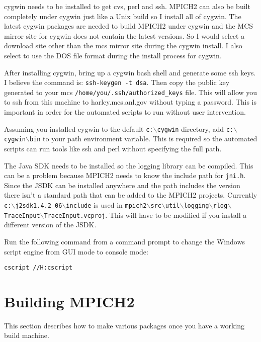 \documentclass[dvipdfm,11pt]{article}
\begin{document}
cygwin needs to be installed to get cvs, perl and ssh.  MPICH2 can also be built completely
under cygwin just like a Unix build so I install all of cygwin.  The latest cygwin packages
are needed to build MPICH2 under cygwin and the MCS mirror site for cygwin does not contain
the latest versions.  So I would select a download site other than the mcs mirror site during
the cygwin install.  I also select to use the DOS file format during the install process for 
cygwin.

After installing cygwin, bring up a cygwin bash shell and generate some ssh keys.  I believe
the command is: \texttt{ssh-keygen -t dsa}.  Then copy the public key generated to your
mcs \texttt{/home/you/.ssh/authorized\_keys} file.  This will allow you to ssh from this machine
to harley.mcs.anl.gov without typing a password.  This is important in order for the 
automated scripts to run without user intervention.

Assuming you installed cygwin to the default \texttt{c:$\backslash$cygwin} directory, add 
\texttt{c:$\backslash$cygwin$\backslash$bin} to your path environment variable.  This is 
required so the automated scripts can run tools like ssh and perl without specifying the 
full path.

The Java SDK needs to be installed so the logging library can be compiled.  This can be a problem
because MPICH2 needs to know the include path for \texttt{jni.h}.  Since the JSDK can be installed anywhere
and the path includes the version there isn't a standard path that can be added to the MPICH2 
projects.  Currently \texttt{c:$\backslash$j2sdk1.4.2\_06$\backslash$include} is used in
\texttt{mpich2$\backslash$src$\backslash$util$\backslash$logging$\backslash$rlog$\backslash$TraceInput$\backslash$TraceInput.vcproj}.
This will have to be modified if you install a different version of the JSDK.

Run the following command from a command prompt to change the Windows script engine from
GUI mode to console mode:
\begin{verbatim}
cscript //H:cscript
\end{verbatim}

\section{Building MPICH2}
\label{sec:building}

This section describes how to make various packages once you have a working build machine.
\end{document}
